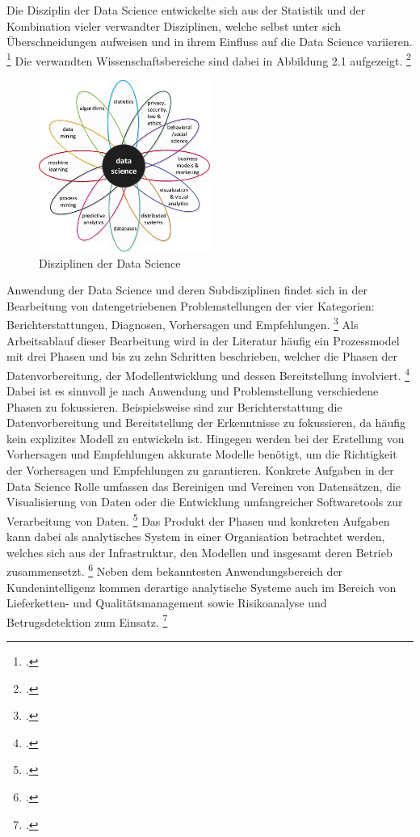 Die Disziplin der Data Science entwickelte sich aus der Statistik und der Kombination vieler verwandter Disziplinen, welche selbst unter sich Überschneidungen aufweisen und in ihrem Einfluss auf die Data Science variieren. \footcite[Vgl.][S. 12]{vanderAalst.2016}
Die verwandten Wissenschaftsbereiche sind dabei in Abbildung 2.1 aufgezeigt. \footcite[Vgl.][S. 12]{vanderAalst.2016}

\begin{figure}[htb]
    \centering
    \includegraphics[width=0.5\textwidth]{graphics/ds_disciplines.png}
    \caption{Disziplinen der Data Science}
    \label{fig:data science disciplines}
\end{figure}

Anwendung der Data Science und deren Subdisziplinen findet sich in der Bearbeitung von datengetriebenen Problemstellungen der vier Kategorien: Berichterstattungen, Diagnosen, Vorhersagen und Empfehlungen. \footcite[Vgl.][S. 10]{vanderAalst.2016}
Als Arbeitsablauf dieser Bearbeitung wird in der Literatur häufig ein Prozessmodel mit drei Phasen und bis zu zehn Schritten beschrieben, welcher die Phasen der Datenvorbereitung, der Modellentwicklung und dessen Bereitstellung involviert. \footcite[Vgl.][S. 1]{Zhang.2020b}
Dabei ist es sinnvoll je nach Anwendung und Problemstellung verschiedene Phasen zu fokussieren.
Beispielsweise sind zur Berichterstattung die Datenvorbereitung und Bereitstellung der Erkenntnisse zu fokussieren, da häufig kein explizites Modell zu entwickeln ist.
Hingegen werden bei der Erstellung von Vorhersagen und Empfehlungen akkurate Modelle benötigt, um die Richtigkeit der Vorhersagen und Empfehlungen zu garantieren.
Konkrete Aufgaben in der Data Science Rolle umfassen das Bereinigen und Vereinen von Datensätzen, die Visualisierung von Daten oder die Entwicklung umfangreicher Softwaretools zur Verarbeitung von Daten. \footcite[Vgl.][S. 13]{Patil.2011}
Das Produkt der Phasen und konkreten Aufgaben kann dabei als analytisches System in einer Organisation betrachtet werden, welches sich aus der Infrastruktur, den Modellen und insgesamt deren Betrieb zusammensetzt. \footcite[Vgl.][S. 22]{Grossman.2014}
Neben dem bekanntesten Anwendungsbereich der Kundenintelligenz kommen derartige analytische Systeme auch im Bereich von Lieferketten- und Qualitätsmanagement sowie Risikoanalyse und Betrugsdetektion zum Einsatz. \footcite[Vgl.][S. 221ff.]{Elgendy.2014}
